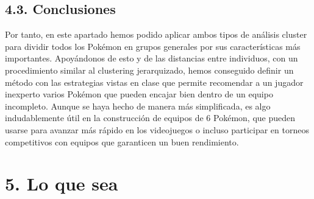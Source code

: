 \documentclass[
  11.8pt,
]{extreport}
\begin{document}
\section{4.3. Conclusiones}\label{conclusiones}

Por tanto, en este apartado hemos podido aplicar ambos tipos de análisis
cluster para dividir todos los Pokémon en grupos generales por sus
características más importantes. Apoyándonos de esto y de las distancias
entre individuos, con un procedimiento similar al clustering
jerarquizado, hemos conseguido definir un método con las estrategias
vistas en clase que permite recomendar a un jugador inexperto varios
Pokémon que pueden encajar bien dentro de un equipo incompleto. Aunque
se haya hecho de manera más simplificada, es algo indudablemente útil en
la construcción de equipos de 6 Pokémon, que pueden usarse para avanzar
más rápido en los videojuegos o incluso participar en torneos
competitivos con equipos que garanticen un buen rendimiento.

\chapter{5. Lo que sea}\label{lo-que-sea}
\end{document}
